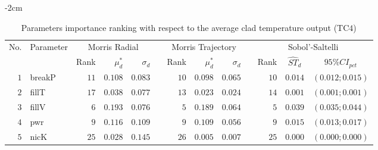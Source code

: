 \begin{table*}[!htbp]\centering
{}
\begin{adjustwidth*}{}{-2cm}
\caption{Parameters importance ranking with respect to the average clad temperature output (TC$4$)}
\label{tab:app_screening_tc4_average}
\begin{tabular}{@{}rlrrrrrrrrrcc@{}}\toprule
\multirow{2}{*}{\footnotesize{No.}} & \multirow{2}{*}{\footnotesize{Parameter}} & \multicolumn{3}{c}{\footnotesize{Morris Radial}} & \phantom{a} & \multicolumn{3}{c}{\footnotesize{Morris Trajectory}}  &\phantom{a}& \multicolumn{3}{c}{\footnotesize{Sobol'-Saltelli}}                               \\             
                                                                                  \cmidrule{3-5}                                                   \cmidrule{7-9}                                                      \cmidrule{11-13}
                                    &                                           & \footnotesize{Rank}   & $\mu^*_d$ & $\sigma_d$   &             & \footnotesize{Rank} & $\mu^*_d$ & $\sigma_d$          &           & \footnotesize{Rank} & \footnotesize{$\hat{ST}_d$} & \footnotesize{$95\%CI_{pct}$}\\ \midrule
\footnotesize{$1 $} & \footnotesize{breakP   } & \footnotesize{$11$} & \footnotesize{$0.108$} & \footnotesize{$0.083$} && \footnotesize{$10$} & \footnotesize{$0.098$} & \footnotesize{$0.065$} && \footnotesize{$10$} & \footnotesize{$0.014$} & \footnotesize{$(0.012;0.015)$} \\
\footnotesize{$2 $} & \footnotesize{fillT    } & \footnotesize{$17$} & \footnotesize{$0.038$} & \footnotesize{$0.077$} && \footnotesize{$13$} & \footnotesize{$0.023$} & \footnotesize{$0.024$} && \footnotesize{$14$} & \footnotesize{$0.001$} & \footnotesize{$(0.001;0.001)$} \\
\footnotesize{$3 $} & \footnotesize{fillV    } & \footnotesize{$6 $} & \footnotesize{$0.193$} & \footnotesize{$0.076$} && \footnotesize{$5 $} & \footnotesize{$0.189$} & \footnotesize{$0.064$} && \footnotesize{$5 $} & \footnotesize{$0.039$} & \footnotesize{$(0.035;0.044)$} \\
\footnotesize{$4 $} & \footnotesize{pwr      } & \footnotesize{$9 $} & \footnotesize{$0.116$} & \footnotesize{$0.109$} && \footnotesize{$9 $} & \footnotesize{$0.109$} & \footnotesize{$0.056$} && \footnotesize{$9 $} & \footnotesize{$0.015$} & \footnotesize{$(0.013;0.017)$} \\
\footnotesize{$5 $} & \footnotesize{nicK     } & \footnotesize{$25$} & \footnotesize{$0.028$} & \footnotesize{$0.145$} && \footnotesize{$26$} & \footnotesize{$0.005$} & \footnotesize{$0.007$} && \footnotesize{$25$} & \footnotesize{$0.000$} & \footnotesize{$(0.000;0.000)$} \\

\end{tabular}
\end{adjustwidth*}
\end{table*}

